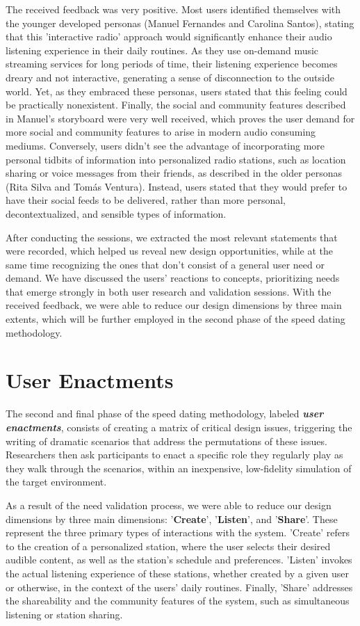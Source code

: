 {The received feedback was very positive. Most users identified themselves with the younger developed personas (Manuel Fernandes and Carolina Santos), stating that this 'interactive radio' approach would significantly enhance their audio listening experience in their daily routines. As they use on-demand music streaming services for long periods of time, their listening experience becomes dreary and not interactive, generating a sense of disconnection to the outside world. Yet, as they embraced these personas, users stated that this feeling could be practically nonexistent. Finally, the social and community features described in Manuel's storyboard were very well received, which proves the user demand for more social and community features to arise in modern audio consuming mediums. Conversely, users didn't see the advantage of incorporating more personal tidbits of information into personalized radio stations, such as location sharing or voice messages from their friends, as described in the older personas (Rita Silva and Tomás Ventura). Instead, users stated that they would prefer to have their social feeds to be delivered, rather than more personal, decontextualized, and sensible types of information.

After conducting the sessions, we extracted the most relevant statements that were recorded, which helped us reveal new design opportunities, while at the same time recognizing the ones that don't consist of a general user need or demand. We have discussed the users' reactions to concepts, prioritizing needs that emerge strongly in both user research and validation sessions. With the received feedback, we were able to reduce our design dimensions by three main extents, which will be further employed in the second phase of the speed dating methodology.

\section{User Enactments}

The second and final phase of the speed dating methodology, labeled \textbf{\textit{user enactments}}, consists of creating a matrix of critical design issues, triggering the writing of dramatic scenarios that address the permutations of these issues. Researchers then ask participants to enact a specific role they regularly play as they walk through the scenarios, within an inexpensive, low-fidelity simulation of the target environment. ~\cite{Davidoff2007}

As a result of the need validation process, we were able to reduce our design dimensions by three main dimensions: '\textbf{Create}', '\textbf{Listen}', and '\textbf{Share}'. These represent the three primary types of interactions with the system. 'Create' refers to the creation of a personalized station, where the user selects their desired audible content, as well as the station's schedule and preferences. 'Listen' invokes the actual listening experience of these stations, whether created by a given user or otherwise, in the context of the users' daily routines. Finally, 'Share' addresses the shareability and the community features of the system, such as simultaneous listening or station sharing.

}
